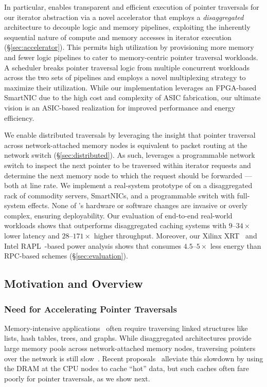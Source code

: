 In particular, \name enables transparent and efficient execution of pointer traversals for our iterator abstraction via a novel accelerator that employs a \emph{disaggregated} architecture to decouple logic and memory pipelines, exploiting the inherently sequential nature of compute and memory accesses in iterator execution (\S\ref{sec:accelerator}). This permits high utilization by provisioning more memory and fewer logic pipelines to cater to memory-centric pointer traversal workloads. A scheduler breaks pointer traversal logic from multiple concurrent workloads across the two sets of pipelines and employs a novel multiplexing strategy to maximize their utilization. While our implementation leverages an FPGA-based SmartNIC due to the high cost and complexity of ASIC fabrication, our ultimate vision is an ASIC-based realization for improved performance and energy efficiency. 

We enable distributed traversals by leveraging the insight that pointer traversal across network-attached memory nodes is equivalent to packet routing at the network switch (\S\ref{sec:distributed}). As such, \name leverages a programmable network switch to inspect the next pointer to be traversed within iterator requests and determine the next memory node to which the request should be forwarded --- both at line rate. We implement a real-system prototype of \name on a disaggregated rack of commodity servers, SmartNICs, and a programmable switch with full-system effects. None of \name's hardware or software changes are invasive or overly complex, ensuring deployability.  Our evaluation of end-to-end real-world workloads shows that \name outperforms disaggregated caching systems with $9$--$34\times$ lower latency and $28$--$171\times$ higher throughput. Moreover, our Xilinx XRT~\cite{xilinx_xrt} and Intel RAPL~\cite{intel_rapl}-based power analysis shows that \name consumes $4.5$--$5\times$ less energy than RPC-based schemes (\S\ref{sec:evaluation}).

\subsection{Motivation and \name Overview}
\label{sec:overview}

\subsubsection{Need for Accelerating Pointer Traversals}
\label{ssec:need}

Memory-intensive applications~\cite{scuba, cachelib, tao, memcache, flighttracker, twittercache, spark} often require traversing linked structures like lists, hash tables, trees, and graphs. 
While disaggregated architectures provide large memory pools across network-attached memory nodes, traversing pointers over the network is still slow~\cite{disagg}. Recent proposals~\cite{disagg, legoos, mind, infiniswap, fastswap} alleviate this slowdown by using the DRAM at the CPU nodes to cache ``hot'' data, but such caches often fare poorly for pointer traversals, as we show next. 

